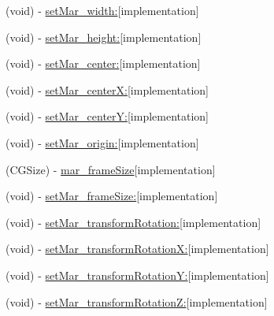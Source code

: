 \begin{DoxyCompactItemize}
\item 
(void) -\/ \hyperlink{category_c_a_layer_07_m_a_r_e_x_08_a00ac41f45e2ed96ecaf3c183033fe093}{set\+Mar\+\_\+width\+:}{\ttfamily  \mbox{[}implementation\mbox{]}}
\item 
(void) -\/ \hyperlink{category_c_a_layer_07_m_a_r_e_x_08_ab7f1fed2c12adaf990a1e0100540eaf7}{set\+Mar\+\_\+height\+:}{\ttfamily  \mbox{[}implementation\mbox{]}}
\item 
(void) -\/ \hyperlink{category_c_a_layer_07_m_a_r_e_x_08_ab80456c8fbf9a90c9c012728a370416c}{set\+Mar\+\_\+center\+:}{\ttfamily  \mbox{[}implementation\mbox{]}}
\item 
(void) -\/ \hyperlink{category_c_a_layer_07_m_a_r_e_x_08_a4bc6b1ccab601f871f595490471df8e0}{set\+Mar\+\_\+center\+X\+:}{\ttfamily  \mbox{[}implementation\mbox{]}}
\item 
(void) -\/ \hyperlink{category_c_a_layer_07_m_a_r_e_x_08_a3a6c5a81af28ad8523ef5a21b8640b99}{set\+Mar\+\_\+center\+Y\+:}{\ttfamily  \mbox{[}implementation\mbox{]}}
\item 
(void) -\/ \hyperlink{category_c_a_layer_07_m_a_r_e_x_08_a1223af036372b5dca16df8bcafdafc27}{set\+Mar\+\_\+origin\+:}{\ttfamily  \mbox{[}implementation\mbox{]}}
\item 
(C\+G\+Size) -\/ \hyperlink{category_c_a_layer_07_m_a_r_e_x_08_ad06a3a7ec8528221cc16ce55f03a085b}{mar\+\_\+frame\+Size}{\ttfamily  \mbox{[}implementation\mbox{]}}
\item 
(void) -\/ \hyperlink{category_c_a_layer_07_m_a_r_e_x_08_a47854a4772acc7d4d20a49234ea05d5e}{set\+Mar\+\_\+frame\+Size\+:}{\ttfamily  \mbox{[}implementation\mbox{]}}
\item 
(void) -\/ \hyperlink{category_c_a_layer_07_m_a_r_e_x_08_a20551de4d86c7eb4a33dd681f4b8e8ff}{set\+Mar\+\_\+transform\+Rotation\+:}{\ttfamily  \mbox{[}implementation\mbox{]}}
\item 
(void) -\/ \hyperlink{category_c_a_layer_07_m_a_r_e_x_08_a9a141e763a035b1d572e35fe72d2298d}{set\+Mar\+\_\+transform\+Rotation\+X\+:}{\ttfamily  \mbox{[}implementation\mbox{]}}
\item 
(void) -\/ \hyperlink{category_c_a_layer_07_m_a_r_e_x_08_aafb1b9db815104f0bf4d701ce2bf84ec}{set\+Mar\+\_\+transform\+Rotation\+Y\+:}{\ttfamily  \mbox{[}implementation\mbox{]}}
\item 
(void) -\/ \hyperlink{category_c_a_layer_07_m_a_r_e_x_08_afd9ea4cfd436e91d41e13f064e7193fc}{set\+Mar\+\_\+transform\+Rotation\+Z\+:}{\ttfamily  \mbox{[}implementation\mbox{]}}
\item 

\end{DoxyCompactItemize}
